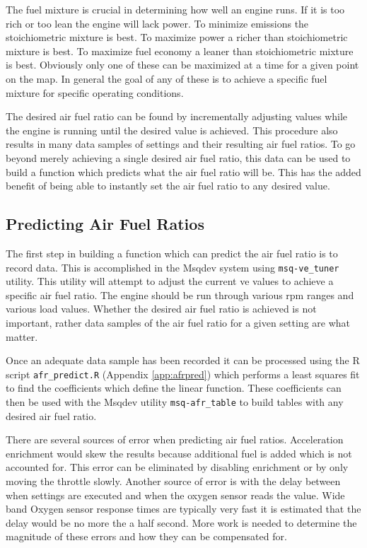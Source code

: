\documentclass{article}
\begin{document}
The fuel mixture is crucial in determining how well an engine runs.
If it is too rich or too lean the engine will lack power.
To minimize emissions the stoichiometric mixture is best.
To maximize power a richer than stoichiometric mixture is best.
To maximize fuel economy a leaner than stoichiometric mixture is best.
Obviously only one of these can be maximized at a time for a given
point on the map.
In general the goal of any of these is to achieve a specific fuel
mixture for specific operating conditions.

The desired air fuel ratio can be found by incrementally adjusting
values while the engine is running until the desired value is achieved.
This procedure also results in many data samples of settings and their
resulting air fuel ratios.
To go beyond merely achieving a single desired air fuel ratio, this data
can be used to build a function which predicts what the air
fuel ratio will be.
This has the added benefit of being able to instantly set the air fuel ratio
to any desired value.

\subsection{Predicting Air Fuel Ratios}
\label{sec:predafr}

The first step in building a function which can predict the air fuel ratio
is to record data.
This is accomplished in the Msqdev system using \verb+msq-ve_tuner+ utility.
This utility will attempt to adjust the current ve values to achieve
a specific air fuel ratio.
The engine should be run through various rpm ranges and various load values.
Whether the desired air fuel ratio is achieved is not important,
rather data samples of the air fuel ratio for a given setting are what
matter.

Once an adequate data sample has been recorded it can be processed 
using the R script \verb+afr_predict.R+ (Appendix \ref{app:afrpred})
which performs a least squares fit to find the coefficients which define
the linear function.
These coefficients can then be used with the Msqdev utility \verb+msq-afr_table+
to build tables with any desired air fuel ratio.



There are several sources of error when predicting air fuel ratios.
Acceleration enrichment would skew the results because additional
fuel is added which is not accounted for.
This error can be eliminated by disabling enrichment or by only
moving the throttle slowly.
Another source of error is with the delay between when settings are
executed and when the oxygen sensor reads the value.
Wide band Oxygen sensor response times are typically very fast it
is estimated that the delay would be no more the a half second.
More work is needed to determine the magnitude of these errors and
how they can be compensated for.
\end{document}
